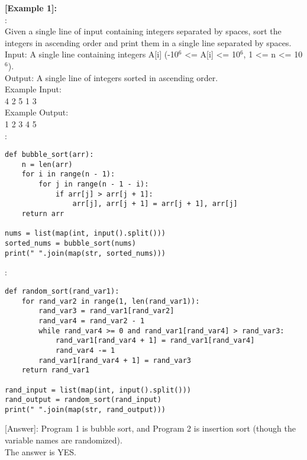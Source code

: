 \noindent\textbf{[Example 1]:}\\
:\\
Given a single line of input containing integers separated by spaces, sort the integers in ascending order and print them in a single line separated by spaces.\\
Input: A single line containing integers A[i] (-10$^6$ <= A[i] <= 10$^6$, 1 <= n <= 10$^6$).\\
Output: A single line of integers sorted in ascending order.\\
Example Input:\\
4 2 5 1 3\\
Example Output:\\
1 2 3 4 5\\
\text{    [Program 1]}:\\
\begin{lstlisting}
def bubble_sort(arr):
    n = len(arr)
    for i in range(n - 1):
        for j in range(n - 1 - i):
            if arr[j] > arr[j + 1]:
                arr[j], arr[j + 1] = arr[j + 1], arr[j]
    return arr

nums = list(map(int, input().split()))
sorted_nums = bubble_sort(nums)
print(" ".join(map(str, sorted_nums)))
\end{lstlisting}
\text{    [Program 2]}:\\
\begin{lstlisting}
def random_sort(rand_var1):
    for rand_var2 in range(1, len(rand_var1)):
        rand_var3 = rand_var1[rand_var2]
        rand_var4 = rand_var2 - 1
        while rand_var4 >= 0 and rand_var1[rand_var4] > rand_var3:
            rand_var1[rand_var4 + 1] = rand_var1[rand_var4]
            rand_var4 -= 1
        rand_var1[rand_var4 + 1] = rand_var3
    return rand_var1

rand_input = list(map(int, input().split()))
rand_output = random_sort(rand_input)
print(" ".join(map(str, rand_output)))
\end{lstlisting}
[Answer]: Program 1 is bubble sort, and Program 2 is insertion sort (though the variable names are randomized).\\
The answer is YES.\\


